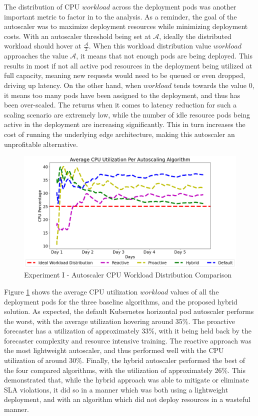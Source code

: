 The distribution of CPU $workload$ across the deployment pods was another important metric to factor in to the analysis. As a reminder, the goal of the autoscaler was to maximize deployment resources while minimizing deployment costs. With an autoscaler threshold being set at $\mathcal{A}$, ideally the distributed workload should hover at $\frac{\mathcal{A}}{2}$. When this workload distribution value $workload$ approaches the value $\mathcal{A}$, it means that not enough pods are being deployed. This results in most if not all active pod resources in the deployment being utilized at full capacity, meaning new requests would need to be queued or even dropped, driving up latency. On the other hand, when $workload$ tends towards the value $0$, it means too many pods have been assigned to the deployment, and thus has been over-scaled. The returns when it comes to latency reduction for such a scaling scenario are extremely low, while the number of idle resource pods being active in the deployment are increasing significantly. This in turn increases the cost of running the underlying edge architecture, making this autoscaler an unprofitable alternative.\par

\begin{figure}[htb]
    \centering
    \caption{Experiment I - Autoscaler CPU Workload Distribution Comparison}
    \label{fig:exp1-cpu-avg-dist}
    \includegraphics[width=0.6\linewidth]{Figures/Home-Timeline-CPU-Usage.png}
\end{figure}

Figure \ref{fig:exp1-cpu-avg-dist} shows the average CPU utilization $workload$ values of all the deployment pods for the three baseline algorithms, and the proposed hybrid solution. As expected, the default Kubernetes horizontal pod autoscaler performs the worst, with the average utilization hovering around 35\%. The proactive forecaster has a utilization of approximately 33\%, with it being held back by the forecaster complexity and resource intensive training. The reactive approach was the most lightweight autoscaler, and thus performed well with the CPU utilization of around 30\%. Finally, the hybrid autoscaler performed the best of the four compared algorithms, with the utilization of approximately 26\%. This demonstrated that, while the hybrid approach was able to mitigate or eliminate SLA violations, it did so in a manner which was both using a lightweight deployment, and with an algorithm which did not deploy resources in a wasteful manner.\par

